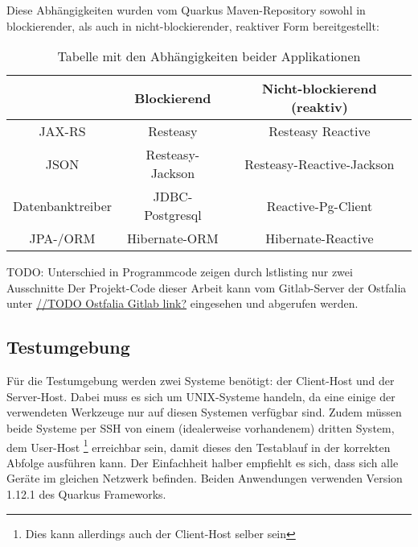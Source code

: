 Diese Abhängigkeiten wurden vom Quarkus Maven-Repository sowohl in blockierender,
als auch in nicht-blockierender, reaktiver Form bereitgestellt: \cite{MavenQuarkusIO}
\setlength{\tabcolsep}{18pt}
\renewcommand{\arraystretch}{1.5}
\begin{table}[ht!]
    \centering
    \begin{tabular}{| c | c | c |}
        \hline
                         & Blockierend      & Nicht-blockierend (reaktiv) \\
        \hline
        JAX-RS           & Resteasy         & Resteasy Reactive           \\
        \hline
        JSON             & Resteasy-Jackson & Resteasy-Reactive-Jackson   \\
        \hline
        Datenbanktreiber & JDBC-Postgresql  & Reactive-Pg-Client          \\
        \hline
        JPA-/ORM         & Hibernate-ORM    & Hibernate-Reactive          \\
        \hline
    \end{tabular}
    \caption{Tabelle mit den Abhängigkeiten beider Applikationen}
    \label{table:dependencies}
\end{table}

TODO: Unterschied in Programmcode zeigen durch lstlisting nur zwei Ausschnitte
Der Projekt-Code dieser Arbeit kann vom Gitlab-Server der Ostfalia unter
\url{//TODO Ostfalia Gitlab link?} eingesehen und abgerufen werden.

\subsection{Testumgebung}
\label{section:testumgebung}
Für die Testumgebung werden zwei Systeme benötigt: der Client-Host und der Server-Host.
Dabei muss es sich um UNIX-Systeme handeln, da eine einige der verwendeten Werkzeuge nur 
auf diesen Systemen verfügbar sind.
Zudem müssen beide Systeme per SSH von einem (idealerweise vorhandenem) dritten System, dem User-Host
\footnote{Dies kann allerdings auch der Client-Host selber sein} 
erreichbar sein, damit dieses den Testablauf in der korrekten Abfolge ausführen kann. 
Der Einfachheit halber empfiehlt es sich, dass sich alle Geräte im gleichen Netzwerk befinden.
Beiden Anwendungen verwenden Version 1.12.1 des Quarkus Frameworks. 

